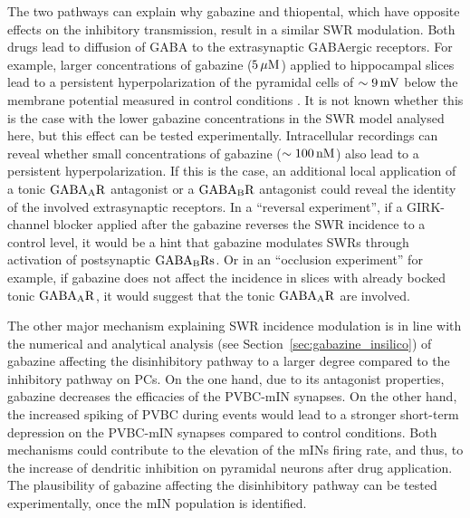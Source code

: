       The two pathways can explain why gabazine and thiopental, which have
      opposite effects on the inhibitory transmission, result in a similar SWR
      modulation. Both drugs lead to diffusion of GABA to the extrasynaptic
      GABAergic receptors. For example, larger concentrations of gabazine
      ($5\,\rm \mu M$) applied to hippocampal slices lead to a persistent
      hyperpolarization of the pyramidal cells of $\sim 9\, \rm mV$ below the
      membrane potential measured in control conditions \citep{Behrens2007}. It
      is not known whether this is the case with the lower gabazine
      concentrations in the SWR model analysed here, but this effect can be
      tested experimentally. Intracellular recordings can reveal whether small
      concentrations of gabazine ($\sim 100 \, \rm nM$) also lead to a
      persistent hyperpolarization. If this is the case, an additional local
      application of a tonic $\rm GABA_AR$ antagonist \citep[e.g.,
      DPP-4-PIO;][]{Boddum2014} or a $\rm GABA_BR$ antagonist could reveal the
      identity of the involved extrasynaptic receptors. In a ``reversal
      experiment'', if a GIRK-channel blocker applied after the gabazine
      reverses the SWR incidence to a control level, it would be a hint that
      gabazine modulates SWRs through activation of postsynaptic $\rm
      GABA_BRs$. Or in an ``occlusion experiment'' for example, if gabazine does
      not affect the incidence in slices with already bocked tonic $\rm
      GABA_AR$, it would suggest that the tonic $\rm GABA_AR$ are involved.

      The other major mechanism explaining SWR incidence modulation is in line
      with the numerical and analytical analysis (see
      Section~\ref{sec:gabazine_insilico}) of gabazine affecting the
      disinhibitory pathway to a larger degree compared to the inhibitory
      pathway on PCs. On the one hand, due to its antagonist properties,
      gabazine decreases the efficacies of the PVBC-mIN synapses. On the other
      hand, the increased spiking of PVBC during events would lead to a
      stronger short-term depression on the PVBC-mIN synapses compared to
      control conditions. Both mechanisms could contribute to the elevation of
      the mINs firing rate, and thus, to the increase of dendritic inhibition
      on pyramidal neurons after drug application. The plausibility of gabazine
      affecting the disinhibitory pathway can be tested experimentally, once
      the mIN population is identified.

